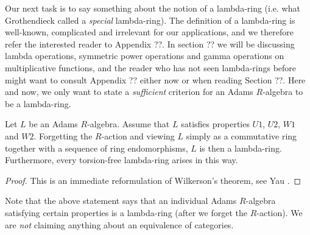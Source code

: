 Our next task is to say something about the notion of a lambda-ring (i.e. what Grothendieck called a \emph{special} lambda-ring). The definition of a lambda-ring is well-known, complicated and irrelevant for our applications, and we therefore refer the interested reader to Appendix ??. In section ?? we will be discussing lambda operations, symmetric power operations and gamma operations on multiplicative functions, and the reader who has not seen lambda-rings before might want to consult Appendix ?? either now or when reading Section ??. Here and now, we only want to state a \emph{sufficient} criterion for an Adams $R$-algebra to be a lambda-ring.

\begin{theorem}
Let $L$ be an Adams $R$-algebra. Assume that $L$ satisfies properties $U1$, $U2$, $W1$ and $W2$. Forgetting the $R$-action and viewing $L$ simply as a commutative ring together with a sequence of ring endomorphisms, $L$ is then a lambda-ring. Furthermore, every torsion-free lambda-ring arises in this way. 
\end{theorem}
\begin{proof}
This is an immediate reformulation of Wilkerson's theorem, see Yau \cite[Theorem ??]{Yau}.
\end{proof}
\begin{remark}
Note that the above statement says that an individual Adams $R$-algebra satisfying certain properties is a lambda-ring (after we forget the $R$-action). We are \emph{not} claiming anything about an equivalence of categories.
\end{remark}





